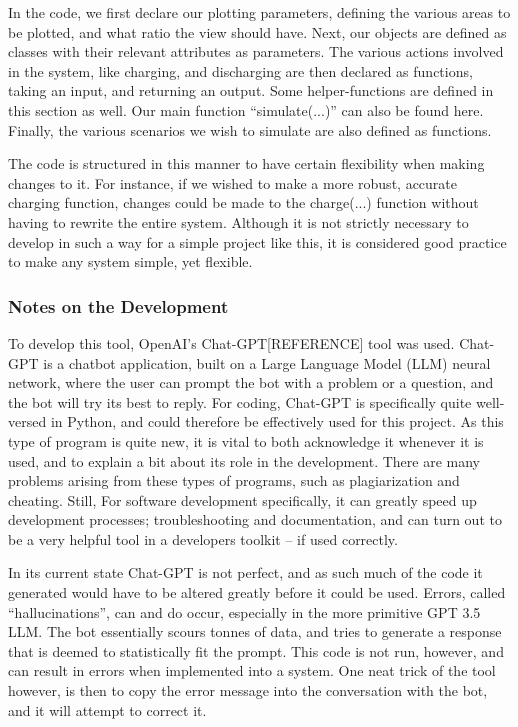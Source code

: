 \documentclass{article}
\begin{document}
In the code, we first declare our plotting parameters, defining the various areas to be plotted, and what ratio the view should have. Next, our objects are defined as classes with their relevant attributes as parameters. The various actions involved in the system, like charging, and discharging are then declared as functions, taking an input, and returning an output. Some helper-functions are defined in this section as well. Our main function “simulate(...)” can also be found here. Finally, the various scenarios we wish to simulate are also defined as functions.

The code is structured in this manner to have certain flexibility when making changes to it. For instance, if we wished to make a more robust, accurate charging function, changes could be made to the charge(...) function without having to rewrite the entire system. Although it is not strictly necessary to develop in such a way for a simple project like this, it is considered good practice to make any system simple, yet flexible.

\subsubsection*{Notes on the Development}

To develop this tool, OpenAI’s Chat-GPT[REFERENCE] tool was used. Chat-GPT is a chatbot application, built on a Large Language Model (LLM) neural network, where the user can prompt the bot with a problem or a question, and the bot will try its best to reply. For coding, Chat-GPT is specifically quite well-versed in Python, and could therefore be effectively used for this project. As this type of program is quite new, it is vital to both acknowledge it whenever it is used, and to explain a bit about its role in the development. There are many problems arising from these types of programs, such as plagiarization and cheating. Still, For software development specifically, it can greatly speed up development processes; troubleshooting and documentation, and can turn out to be a very helpful tool in a developers toolkit -- if used correctly.

In its current state Chat-GPT is not perfect, and as such much of the code it generated would have to be altered greatly before it could be used. Errors, called “hallucinations”, can and do occur, especially in the more primitive GPT 3.5 LLM. The bot essentially scours tonnes of data, and tries to generate a response that is deemed to statistically fit the prompt. This code is not run, however, and can result in errors when implemented into a system. One neat trick of the tool however, is then to copy the error message into the conversation with the bot, and it will attempt to correct it.
\end{document}
